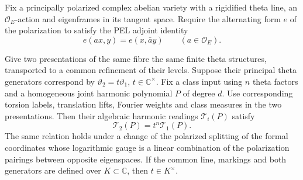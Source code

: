 \begin{auxlemma}\label{lem:marked-theta-fibre-comparison}
Fix a principally polarized complex abelian variety with a
rigidified theta line, an \(\mathcal O_E\)-action and eigenframes in its
tangent space. Require the alternating form \(e\) of the polarization
to satisfy the PEL adjoint identity
\[
          e(ax,y)=e(x,\bar a y)\qquad (a\in\mathcal O_E).
\]

Give two presentations of the same fibre the same
finite theta structures, transported to a common refinement of
their levels. Suppose their principal theta generators correspond
by \(\vartheta_2=t\vartheta_1\), \(t\in\mathbb C^\times\).
Fix a class input using \(n\) theta factors and a homogeneous joint
harmonic polynomial \(P\) of degree \(d\). Use corresponding
torsion labels, translation lifts, Fourier weights and class
measures in the two presentations. Then their algebraic harmonic
readings \(\mathcal T_i(P)\) satisfy
\[
              \mathcal T_2(P)=t^n\mathcal T_1(P).
\]
The same relation holds under a change of the polarized splitting
of the formal coordinates whose logarithmic gauge is a linear
combination of the polarization pairings between opposite
eigenspaces. If the common line, markings and both generators are
defined over \(K\subset\mathbb C\), then \(t\in K^\times\).
\end{auxlemma}
